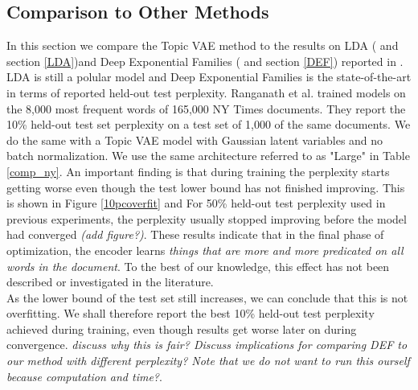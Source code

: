 \documentclass{report}
\begin{document}
	\subsection{Comparison to Other Methods}\label{comp_other}
	In this section we compare the Topic VAE method to the results on LDA (\cite{blei2003latent} and section \ref{LDA})and Deep Exponential Families (\cite{ranganath2015deep} and section \ref{DEF}) reported in \cite{ranganath2015deep}. LDA is still a polular model and Deep Exponential Families is the state-of-the-art in terms of reported held-out test perplexity. Ranganath et al. \cite{ranganath2015deep} trained models on the 8,000 most frequent words of 165,000 NY Times documents. They report the 10\% held-out test set perplexity on a test set of 1,000 of the same documents. We do the same with a Topic VAE model with Gaussian latent variables and no batch normalization. We use the same architecture referred to as "Large" in Table \ref{comp_ny}. An important finding is that during training the perplexity starts getting worse even though the test lower bound has not finished improving. This is shown in Figure \ref{10pcoverfit} and  For 50\% held-out test perplexity used in previous experiments, the perplexity usually stopped improving before the model had converged \textit{(add figure?)}. These results indicate that in the final phase of optimization, the encoder learns \textit{things that are more and more predicated on all words in the document}. To the best of our knowledge, this effect has not been described or investigated in the literature. \\
	As the lower bound of the test set still increases, we can conclude that this is not overfitting. We shall therefore report the best 10\% held-out test perplexity achieved during training, even though results get worse later on during convergence. \textit{discuss why this is fair? Discuss implications for comparing DEF to our method with different perplexity? Note that we do not want to run this ourself because computation and time?}.
	
\end{document}
